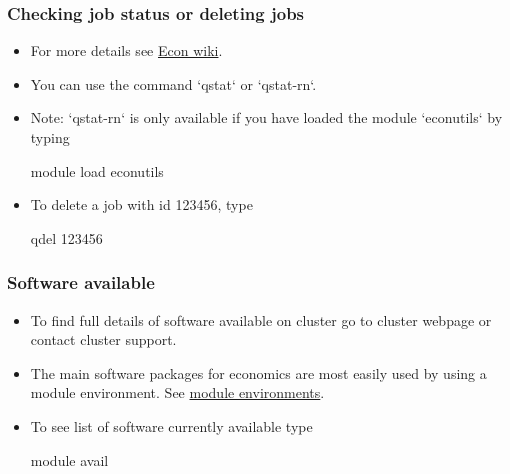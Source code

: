 \documentclass{beamer}
\begin{document}
\begin{frame}
\frametitle{Checking job status or deleting jobs}

\begin{itemize}
\item For more details see \textcolor{blue}{\href{https://www.econ.ucl.ac.uk/wiki/index.php/Checking_the_status_of_your_jobs}{Econ wiki}}.
\item You can use the command `qstat` or `qstat-rn`.
\item Note: `qstat-rn` is only available if you have loaded the module `econutils` by typing
\begin{semiverbatim}
module load econutils
\end{semiverbatim}
\item To delete a job with id 123456, type
\begin{semiverbatim}
qdel 123456
\end{semiverbatim}
\end{itemize}
\end{frame}
\begin{frame}
\frametitle{Software available}
\begin{itemize}
\item To find full details of software available on cluster go to cluster webpage or contact cluster support.
\item The main software packages for economics are most easily used by using a module environment. See 
\textcolor{blue}{\href{https://www.econ.ucl.ac.uk/wiki/index.php/The_Module_Environment}{module environments}}. 
\item To see list of software currently available type \vspace{0.2cm}
\begin{semiverbatim}
module avail
\end{semiverbatim}
\end{itemize}
\end{frame}
\end{document}
